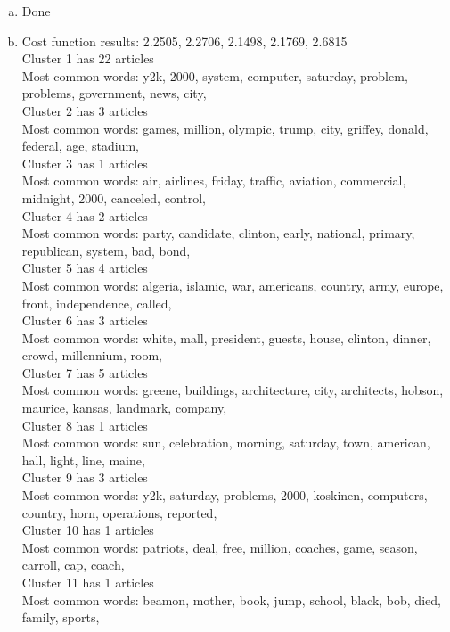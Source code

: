 \documentclass[twoside,11pt]{article}
\theoremstyle{definition}
\begin{document}
\begin{enumerate}[(a)]
\item Done
\item Cost function results: 2.2505, 2.2706, 2.1498, 2.1769, 2.6815 \\
Cluster 1 has 22 articles \\
Most common words: y2k, 2000, system, computer, saturday, problem, problems, government, news, city, \\
Cluster 2 has 3 articles \\
Most common words: games, million, olympic, trump, city, griffey, donald, federal, age, stadium, \\
Cluster 3 has 1 articles \\
Most common words: air, airlines, friday, traffic, aviation, commercial, midnight, 2000, canceled, control, \\
Cluster 4 has 2 articles \\
Most common words: party, candidate, clinton, early, national, primary, republican, system, bad, bond, \\
Cluster 5 has 4 articles \\
Most common words: algeria, islamic, war, americans, country, army, europe, front, independence, called, \\
Cluster 6 has 3 articles \\
Most common words: white, mall, president, guests, house, clinton, dinner, crowd, millennium, room, \\
Cluster 7 has 5 articles \\
Most common words: greene, buildings, architecture, city, architects, hobson, maurice, kansas, landmark, company, \\
Cluster 8 has 1 articles \\
Most common words: sun, celebration, morning, saturday, town, american, hall, light, line, maine, \\
Cluster 9 has 3 articles \\
Most common words: y2k, saturday, problems, 2000, koskinen, computers, country, horn, operations, reported, \\
Cluster 10 has 1 articles \\
Most common words: patriots, deal, free, million, coaches, game, season, carroll, cap, coach, \\
Cluster 11 has 1 articles \\
Most common words: beamon, mother, book, jump, school, black, bob, died, family, sports, \\

\end{enumerate}
\end{document}
